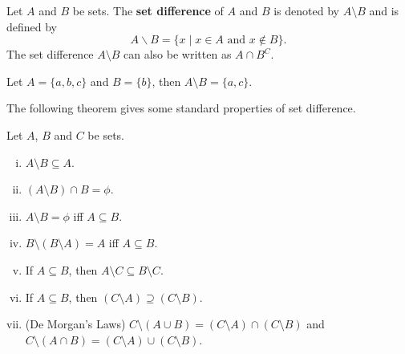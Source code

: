 \documentclass[a4paper,english,12pt]{article}
\begin{document}
\begin{defn} 
Let $A$ and $B$ be sets. The \textbf{set difference} of $A$ and $B$ is denoted by $A \setminus B$ and is defined by 
 \begin{equation}
  A \backslash B = \{ x \; | \;  x \in A \text{ and } x \notin B  \}.
 \end{equation}
The set difference $A \setminus B$ can also be written as $A \cap B^{C}$.
\end{defn}

\begin{exmp}
Let $A = \{a, b, c\}$ and $B = \{b \}$, then $A \setminus B = \{a, c\}$. 
\end{exmp}

The following theorem gives some standard properties of set difference.
\begin{thm}
 Let $A$, $B$ and $C$ be sets.
 \begin{enumerate}[i)]
  \item $A \setminus B \subseteq A$.
  \item $(A \setminus B) \cap B = \phi$.
  \item $A \setminus B = \phi$ iff $A \subseteq B$.
  \item $B \setminus (B \setminus A) = A$ iff $A \subseteq B$.
  \item If $A \subseteq B$, then $A \setminus C \subseteq B \setminus C$.
  \item If $A \subseteq B$, then $(C \setminus A) \supseteq (C \setminus B)$.
  \item (De Morgan's Laws) $C \setminus (A \cup B) = (C \setminus A) \cap (C \setminus B)$ and $C \setminus (A \cap B) = (C \setminus A) \cup (C \setminus B)$.
 \end{enumerate}
\end{thm}
\end{document}
